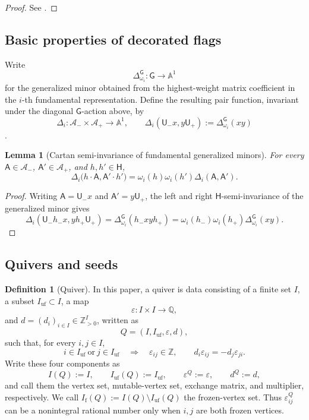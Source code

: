 \documentclass[10pt,a4paper]{article}
\newtheorem{lemma}[theorem]{Lemma}
\theoremstyle{definition}
\newtheorem{definition}[theorem]{Definition}
\theoremstyle{remark}
\newcommand{\Aplus}{\mathcal A_+}
\newcommand{\Aminus}{\mathcal A_-}
\newcommand{\flagA}{\mathsf{A}}
\newcommand{\groupG}{\mathsf{G}}
\newcommand{\unipotentU}{\mathsf{U}}
\newcommand{\torusH}{\mathsf{H}}
\newcommand{\eps}{\varepsilon}
\begin{document}
\begin{proof}
See \cite[Lemma~2.5]{ShenWeng2021}.
\end{proof}

\subsection{Basic properties of decorated flags}

Write
\[
 \Delta_{\omega_i}^{\groupG}:\groupG\longrightarrow\mathbb A^1
\]
for the generalized minor obtained from the highest-weight matrix coefficient
in the \(i\)-th fundamental representation.  Define the resulting pair
function, invariant under the diagonal \(\groupG\)-action above, by
\[
 \Delta_i:\Aminus\times\Aplus\longrightarrow\mathbb A^1,\qquad
 \Delta_i(\unipotentU_-x,y\unipotentU_+)
 :=\Delta_{\omega_i}^{\groupG}(xy)
\]
\cite[Section~2.1 and Definition~3.20]{ShenWeng2021}.

\begin{lemma}[Cartan semi-invariance of fundamental generalized minors]
\label{lem:minor-cartan-semi-invariance}
For every \(\flagA\in\Aminus\), \(\flagA'\in\Aplus\), and
\(h,h'\in\torusH\),
\[
 \Delta_i\bigl(
  h\mathbin{\cdot}\flagA,
  \flagA'\mathbin{\cdot}h'
 \bigr)
 =
 \omega_i(h)\omega_i(h')
 \Delta_i(\flagA,\flagA').
\]
\end{lemma}

\begin{proof}
Writing \(\flagA=\unipotentU_-x\) and
\(\flagA'=y\unipotentU_+\), the left and right
\(\torusH\)-semi-invariance of the generalized minor gives
\[
 \Delta_i(\unipotentU_-h_-x,yh_+\unipotentU_+)
 =\Delta_{\omega_i}^{\groupG}(h_-xyh_+)
 =\omega_i(h_-)\omega_i(h_+)\Delta_{\omega_i}^{\groupG}(xy).
\]
\end{proof}

\subsection{Quivers and seeds}

\begin{definition}[Quiver]
\label{def:quiver}
In this paper, a quiver is data consisting of a finite set \(I\), a subset
\(I_{\mathrm{uf}}\subset I\), a map
\[
 \eps:I\times I\longrightarrow\mathbb Q,
\]
and \(d=(d_i)_{i\in I}\in\mathbb Z_{>0}^{I}\), written as
\[
 Q=(I,I_{\mathrm{uf}},\eps,d),
\]
such that, for every \(i,j\in I\),
\[
 i\in I_{\mathrm{uf}}\ \text{or}\ j\in I_{\mathrm{uf}}
 \quad\Longrightarrow\quad \eps_{ij}\in\mathbb Z,
 \qquad
 d_i\eps_{ij}=-d_j\eps_{ji}.
\]
Write these four components as
\[
 I(Q):=I,\qquad I_{\mathrm{uf}}(Q):=I_{\mathrm{uf}},\qquad
 \eps^Q:=\eps,\qquad d^Q:=d,
\]
and call them the vertex set, mutable-vertex set, exchange matrix, and
multiplier, respectively.  We call
\(I_{\mathrm f}(Q):=I(Q)\setminus I_{\mathrm{uf}}(Q)\) the frozen-vertex set.
Thus \(\eps^Q_{ij}\) can be a nonintegral rational number only when
\(i,j\) are both frozen vertices.
\end{definition}
\end{document}
